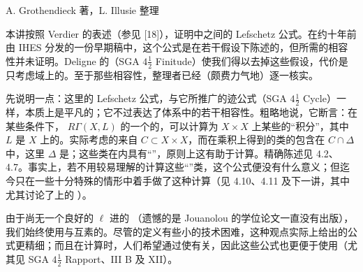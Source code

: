 \begin{center}A. Grothendieck 著，L. Illusie 整理\end{center}
本讲按照 Verdier 的表述（参见 [18]），证明中之间的 Lefschetz 公式。在约十年前由 IHES 分发的一份早期稿中，这个公式是在若干假设下陈述的，但所需的相容性并未证明。Deligne 的（SGA $4\frac12$ Finitude）使我们得以去掉这些假设，代价是只考虑域上的。至于那些相容性，整理者已经（颇费力气地）逐一核实。

先说明一点：这里的 Lefschetz 公式，与它所推广的迹公式（SGA $4\frac12$ Cycle）一样，本质上是平凡的；它不过表达了体系中的若干相容性。粗略地说，它断言：在某些条件下， $R\Gamma(X,L)$ 的一个的，可以计算为 $X\times X$ 上某些的“积分”，其中 $L$ 是 $X$ 上的。实际考虑的来自 $C\subset X\times X$，而在乘积上得到的类的包含在 $C\cap\Delta$ 中，这里 $\Delta$ 是；这些类在内具有“”，原则上这有助于计算。精确陈述见 4.2、4.7。事实上，若不用较易理解的计算这些“”类，这个公式便没有什么意义；但迄今只在一些十分特殊的情形中着手做了这种计算（见 4.10、4.11 及下一讲，其中尤其讨论了上的 ）。

由于尚无一个良好的 $\ell$ 进的
（遗憾的是 Jouanolou 的学位论文一直没有出版），我们始终使用与互素的。尽管的定义有些小的技术困难，这种观点实际上给出的公式更精细；而且在计算时，人们希望通过使有关，因此这些公式也更便于使用（尤其见 SGA $4\frac12$ Rapport、III B 及 XII）。

